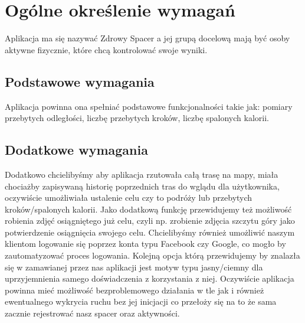 	\newpage
\section{Ogólne określenie wymagań}		%

\hspace{1cm} Aplikacja ma się nazywać Zdrowy Spacer a jej grupą docelową mają być osoby aktywne fizycznie, które chcą kontrolować swoje wyniki.


\subsection{Podstawowe wymagania}  %

\hspace{1cm} Aplikacja powinna ona spełniać podstawowe funkcjonalności takie jak: pomiary przebytych odległości, liczbę przebytych kroków, liczbę spalonych kalorii.%

\subsection{Dodatkowe wymagania}  %

\hspace{1cm} Dodatkowo chcielibyśmy aby aplikacja rzutowała całą trasę na mapy, miała chociażby zapisywaną historię poprzednich tras do wglądu dla użytkownika, oczywiście umożliwiała ustalenie celu czy to podróży lub przebytych kroków/spalonych kalorii. Jako dodatkową funkcję przewidujemy też możliwość robienia zdjęć osiągniętego już celu, czyli np. zrobienie zdjęcia szczytu góry jako potwierdzenie osiągnięcia swojego celu. Chcielibyśmy również umożliwić naszym klientom logowanie się poprzez konta typu Facebook czy Google, co mogło by zautomatyzować proces logowania. Kolejną opcja którą przewidujemy by znalazła się w zamawianej przez nas aplikacji jest motyw typu jasny/ciemny dla uprzyjemnienia samego doświadczenia z korzystania z niej. Oczywiście aplikacja powinna mieć możliwość bezproblemowego działania w tle jak i również ewentualnego wykrycia ruchu bez jej inicjacji co przełoży się na to że sama zacznie rejestrować nasz spacer oraz aktywności.



